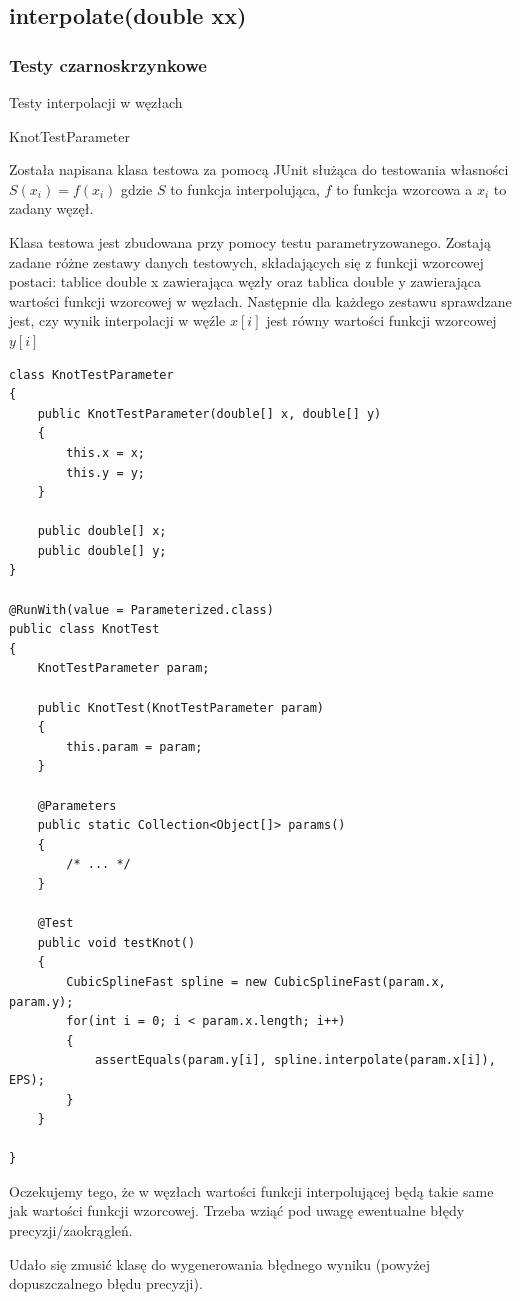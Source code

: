 \documentclass[12pt,a4paper,notitlepage]{article}
\begin{document}
\subsection{interpolate(double xx)}
\subsubsection{Testy czarnoskrzynkowe}
\begin{description}
\item Testy interpolacji w węzłach
\item [Nazwa testu] KnotTestParameter
\item [Opis] Została napisana klasa testowa za pomocą JUnit służąca do testowania własności $S(x_i) = f(x_i)$ gdzie $S$ to funkcja interpolująca, $f$ to funkcja wzorcowa a $x_i$ to zadany węzęł.
\item [Sposób realizacji] Klasa testowa jest zbudowana przy pomocy testu parametryzowanego. Zostają zadane różne zestawy danych testowych, składających się z funkcji wzorcowej postaci: tablice double x zawierająca węzły oraz tablica double y zawierająca wartości funkcji wzorcowej w węzłach. Następnie dla każdego zestawu sprawdzane jest, czy wynik interpolacji w węźle $x[i]$ jest równy wartości funkcji wzorcowej $y[i]$
\begin{lstlisting}
class KnotTestParameter
{
    public KnotTestParameter(double[] x, double[] y)
    {
        this.x = x;
        this.y = y;
    }

    public double[] x;
    public double[] y;
}

@RunWith(value = Parameterized.class)
public class KnotTest
{
    KnotTestParameter param;

    public KnotTest(KnotTestParameter param)
    {
        this.param = param;
    }

    @Parameters
    public static Collection<Object[]> params()
    {
       	/* ... */
    }

    @Test
    public void testKnot()
    {
        CubicSplineFast spline = new CubicSplineFast(param.x, param.y);
        for(int i = 0; i < param.x.length; i++)
        {
            assertEquals(param.y[i], spline.interpolate(param.x[i]), EPS);
        }
    }

}
\end{lstlisting}
Oczekujemy tego, że w węzłach wartości funkcji interpolującej będą takie same jak wartości funkcji wzorcowej. Trzeba wziąć pod uwagę ewentualne błędy precyzji/zaokrągleń.
\item [Wyniki] Udało się zmusić klasę do wygenerowania błędnego wyniku (powyżej dopuszczalnego błędu precyzji).
\end{description}
\end{document}
